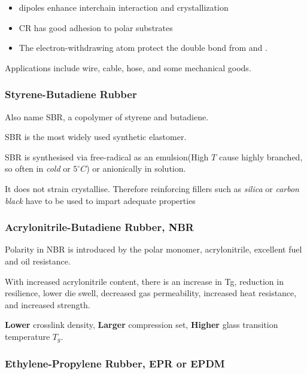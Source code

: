 \documentclass{NoteThesis/note-thesis}
\begin{document}
\begin{itemize}
    \item {} dipoles enhance interchain interaction and crystallization
    \item CR has good adhesion to polar substrates
    \item The electron-withdrawing  atom protect the double bond from  and .
\end{itemize}


Applications include wire, cable, hose, and some mechanical goods.

\subsubsection*{Styrene-Butadiene Rubber}

Also name SBR, a copolymer of styrene and butadiene.


SBR is the most widely used synthetic elastomer.

SBR is synthesised via free-radical as an emulsion(High $T$ cause highly branched, so often in \textit{cold} or $5^\circ C$) or anionically in solution.

It does not strain crystallise. Therefore reinforcing fillers such as \textit{silica} or \textit{carbon black} have to be used to impart adequate properties

\subsubsection*{Acrylonitrile-Butadiene Rubber, NBR}

Polarity in NBR is introduced by the polar monomer, acrylonitrile, excellent fuel and oil resistance.

With increased acrylonitrile content, there is an increase in Tg, reduction in resilience, lower die swell, decreased gas permeability, increased heat resistance, and increased strength.


\begin{mynote_env}[frametitle={Higher ACN Ratio}]
    \textbf{Lower} crosslink density, \textbf{Larger} compression set, \textbf{Higher} glass transition temperature $T_g$.
\end{mynote_env}

\subsubsection*{Ethylene-Propylene Rubber, EPR or EPDM}
\end{document}
